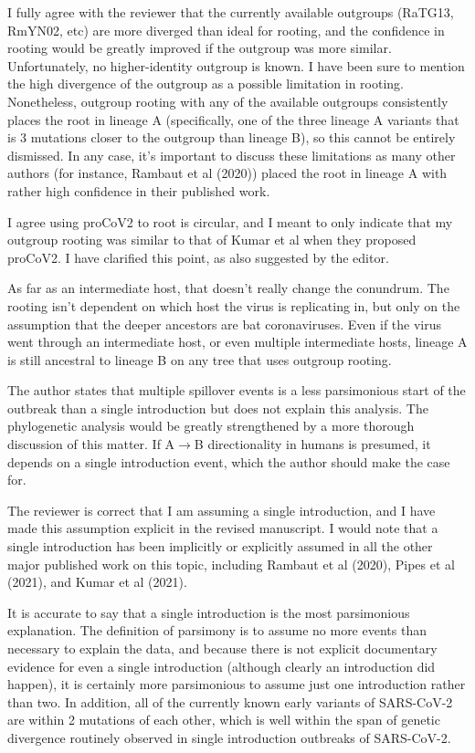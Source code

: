 \documentclass[11pt, oneside]{article}   	%
\newcommand{\response}[1]{{\color{black}#1}}
\begin{document}
\response{I fully agree with the reviewer that the currently available outgroups (RaTG13, RmYN02, etc) are more diverged than ideal for rooting, and the confidence in rooting would be greatly improved if the outgroup was more similar.
Unfortunately, no higher-identity outgroup is known.
I have been sure to mention the high divergence of the outgroup as a possible limitation in rooting.
Nonetheless, outgroup rooting with any of the available outgroups consistently places the root in lineage A (specifically, one of the three lineage A variants that is 3 mutations closer to the outgroup than lineage B), so this cannot be entirely dismissed.
In any case, it's important to discuss these limitations as many other authors (for instance, Rambaut et al (2020)) placed the root in lineage A with rather high confidence in their published work.

I agree using proCoV2 to root is circular, and I meant to only indicate that my outgroup rooting was similar to that of Kumar et al when they proposed proCoV2. I have clarified this point, as also suggested by the editor.

As far as an intermediate host, that doesn't really change the conundrum.
The rooting isn't dependent on which host the virus is replicating in, but only on the assumption that the deeper ancestors are bat coronaviruses.
Even if the virus went through an intermediate host, or even multiple intermediate hosts, lineage A is still ancestral to lineage B on any tree that uses outgroup rooting.
}

The author states that multiple spillover events is a less parsimonious start of the outbreak than a single introduction but does not explain this analysis. The phylogenetic analysis would be greatly strengthened by a more thorough discussion of this matter. If A$\rightarrow$B directionality in humans is presumed, it depends on a single introduction event, which the author should make the case for.

\response{
The reviewer is correct that I am assuming a single introduction, and I have made this assumption explicit in the revised manuscript.
I would note that a single introduction has been implicitly or explicitly assumed in all the other major published work on this topic, including Rambaut et al (2020), Pipes et al (2021), and Kumar et al (2021).

It is accurate to say that a single introduction is the most parsimonious explanation.
The definition of parsimony is to assume no more events than necessary to explain the data, and because there is not explicit documentary evidence for even a single introduction (although clearly an introduction did happen), it is certainly more parsimonious to assume just one introduction rather than two.
In addition, all of the currently known early variants of SARS-CoV-2 are within 2 mutations of each other, which is well within the span of genetic divergence routinely observed in single introduction outbreaks of SARS-CoV-2.
}
\end{document}
